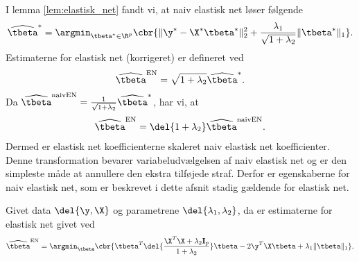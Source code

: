 I lemma \ref{lem:elastisk_net} fandt vi, at naiv elastisk net løser følgende 
\begin{align}
\widehat{\tbeta}^* = \argmin_{\tbeta^* \in \R^p} \cbr{ \Vert \y^* - \X^* \tbeta^* \Vert_2^2 + \frac{\lambda_1}{\sqrt{1+\lambda_2}} \Vert \tbeta^* \Vert_1}. \label{eq:EN8}
\end{align}
Estimaterne for elastisk net (korrigeret) er defineret ved
\begin{align*}
\widehat{\tbeta}^\text{EN} = \sqrt{1+\lambda_2} \widehat{\tbeta}^*.
\end{align*}
Da \(\widehat{\tbeta}^\text{naivEN} = \frac{1}{\sqrt{1+\lambda_2}} \widehat{\tbeta}^*\), har vi, at
\begin{align*}
\widehat{\tbeta}^\text{EN} = \del{1+\lambda_2} \widehat{\tbeta}^\text{naivEN}.
\end{align*}
Dermed er elastisk net koefficienterne skaleret naiv elastisk net koefficienter.
Denne transformation bevarer variabeludvælgelsen af naiv elastisk net og er den simpleste måde at annullere den ekstra tilføjede straf.
Derfor er egenskaberne for naiv elastisk net, som er beskrevet i dette afsnit stadig gældende for elastisk net.
%
\begin{thm} \label{thm:elastisk_net2}
Givet data \(\del{\y, \X}\) og parametrene \(\del{\lambda_1, \lambda_2}\), da er estimaterne for elastisk net givet ved
\begin{align}
\widehat{\tbeta}^\text{EN} = \argmin_{\tbeta} \cbr{ \tbeta^T \del{\frac{\X^T \X + \lambda_2 \mathbf{I}_p}{1 + \lambda_2}} \tbeta - 2 \y^T \X \tbeta + \lambda_1 \Vert \tbeta \Vert_1}. \label{eq:EN6}
\end{align}
\end{thm}
